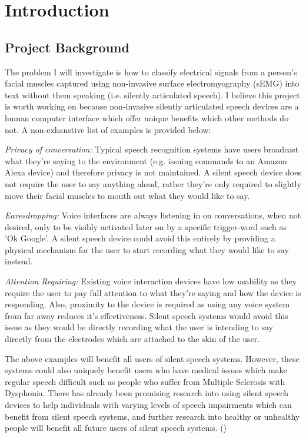 \chapter{Introduction} \label{chap:intro}

\section{Project Background}

The problem I will investigate is how to classify electrical signals from a person's facial
muscles captured using non-invasive surface electromyography (sEMG) into text without
them speaking (i.e. silently articulated speech). I believe this project is worth working on
because non-invasive silently articulated speech devices are a human computer interface
which offer unique benefits which other methods do not. A non-exhaustive list of examples
is provided below:

\emph{Privacy of conversation:} Typical speech recognition systems have users broadcast
what they're saying to the environment (e.g. issuing commands to an Amazon Alexa
device) and therefore privacy is not maintained. A silent speech device does not require the
user to say anything aloud, rather they're only required to slightly move their facial muscles
to mouth out what they would like to say.

\emph{Eavesdropping:} Voice interfaces are always listening in on conversations, when not
desired, only to be visibly activated later on by a specific trigger-word such as 'Ok Google'.
A silent speech device could avoid this entirely by providing a physical mechanism for the
user to start recording what they would like to say instead.

\emph{Attention Requiring:} Existing voice interaction devices have low usability as they
require the user to pay full attention to what they're saying and how the device is
responding. Also, proximity to the device is required as using any voice system from far
away reduces it's effectiveness. Silent speech systems would avoid this issue as they
would be directly recording what the user is intending to say directly from the electrodes
which are attached to the skin of the user.

The above examples will benefit all users of silent speech systems. However, these
systems could also uniquely benefit users who have medical issues which make regular
speech difficult such as people who suffer from Multiple Sclerosis with Dysphonia. There
has already been promising research into using silent speech devices to help individuals
with varying levels of speech impairments which can benefit from silent speech systems,
and further research into healthy or unhealthy people will benefit all future users of silent
speech systems.
(\cite{pmlr-v116-kapur20a})

